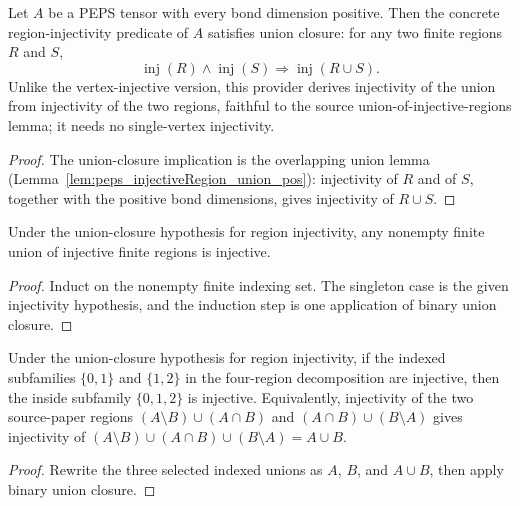 \begin{theorem}%
    \label{thm:peps_regionInjectivityUnionClosure_of_overlap}
    \leanok
    Let $A$ be a PEPS tensor with every bond dimension positive. Then the
    concrete region-injectivity predicate of $A$ satisfies union closure: for
    any two finite regions $R$ and $S$,
    \[
        \operatorname{inj}(R)\wedge\operatorname{inj}(S)
        \Longrightarrow
        \operatorname{inj}(R\cup S).
    \]
    Unlike the vertex-injective version, this provider derives injectivity of
    the union from injectivity of the two regions, faithful to the source
    union-of-injective-regions lemma; it needs no single-vertex injectivity.
\end{theorem}
\begin{proof}\leanok
    The union-closure implication is the overlapping union lemma
    (Lemma~\ref{lem:peps_injectiveRegion_union_pos}): injectivity of $R$ and of
    $S$, together with the positive bond dimensions, gives injectivity of
    $R\cup S$.
\end{proof}

\begin{lemma}%
    \label{lem:peps_regionInjectivityUnionClosure_finite}
    \leanok
    Under the union-closure hypothesis for region injectivity, any nonempty
    finite union of injective finite regions is injective.
\end{lemma}
\begin{proof}\leanok
    Induct on the nonempty finite indexing set. The singleton case is the
    given injectivity hypothesis, and the induction step is one application of
    binary union closure.
\end{proof}

\begin{lemma}%
    \label{lem:peps_regionInjectivityUnionClosure_inside}
    \leanok
    Under the union-closure hypothesis for region injectivity, if the indexed
    subfamilies $\{0,1\}$ and $\{1,2\}$ in the four-region decomposition
    are injective, then the inside subfamily $\{0,1,2\}$ is injective.
    Equivalently, injectivity of the two source-paper regions
    $(A\setminus B)\cup(A\cap B)$ and
    $(A\cap B)\cup(B\setminus A)$ gives injectivity of
    $(A\setminus B)\cup(A\cap B)\cup(B\setminus A)=A\cup B$.
\end{lemma}
\begin{proof}\leanok
    Rewrite the three selected indexed unions as $A$, $B$, and $A\cup B$,
    then apply binary union closure.
\end{proof}
